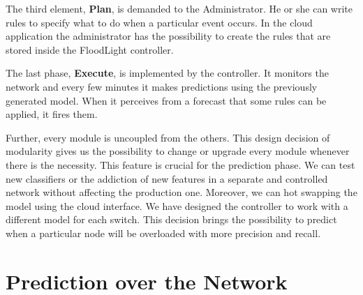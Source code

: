 \documentclass[12pt]{article}
\begin{document}
The third element, \textbf{Plan}, is demanded to the Administrator.
He or she can write rules to specify what to do when a particular event occurs.
In the cloud application the administrator has the possibility to create the rules that are stored inside the FloodLight controller.


The last phase, \textbf{Execute}, is implemented by the controller. 
It monitors the network and every few minutes it makes predictions using the previously generated model.
When it perceives from a forecast that some rules can be applied, it fires them.


Further, every module is uncoupled from the others. 
This design decision of modularity gives us the possibility to change or upgrade every module whenever there is the necessity.
This feature is crucial for the prediction phase.
We can test new classifiers or the addiction of new features in a separate and controlled network without affecting the production one. Moreover, we can hot swapping the model using the cloud interface.
We have designed the controller to work with a different model for each switch. 
This decision brings the possibility to predict when a particular node will be overloaded with more precision and recall.\\

 







\section{Prediction over the Network}
\end{document}
